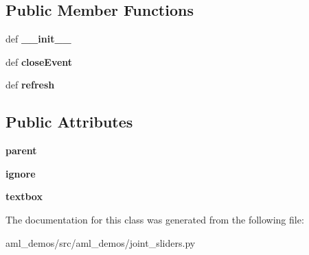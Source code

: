 \subsection*{Public Member Functions}
\begin{DoxyCompactItemize}
\item 
\hypertarget{classaml__demos_1_1joint__sliders_1_1_state_popup_a8aced35ad440a8c853843206334f47fd}{def {\bfseries \-\_\-\-\_\-init\-\_\-\-\_\-}}\label{classaml__demos_1_1joint__sliders_1_1_state_popup_a8aced35ad440a8c853843206334f47fd}

\item 
\hypertarget{classaml__demos_1_1joint__sliders_1_1_state_popup_a59a90fad6f1406fccb74091d907baaf0}{def {\bfseries close\-Event}}\label{classaml__demos_1_1joint__sliders_1_1_state_popup_a59a90fad6f1406fccb74091d907baaf0}

\item 
\hypertarget{classaml__demos_1_1joint__sliders_1_1_state_popup_abcc60896031b621b681c9b1556e28df5}{def {\bfseries refresh}}\label{classaml__demos_1_1joint__sliders_1_1_state_popup_abcc60896031b621b681c9b1556e28df5}

\end{DoxyCompactItemize}
\subsection*{Public Attributes}
\begin{DoxyCompactItemize}
\item 
\hypertarget{classaml__demos_1_1joint__sliders_1_1_state_popup_a3407f51616c17fbf221195112c8d7e23}{{\bfseries parent}}\label{classaml__demos_1_1joint__sliders_1_1_state_popup_a3407f51616c17fbf221195112c8d7e23}

\item 
\hypertarget{classaml__demos_1_1joint__sliders_1_1_state_popup_aefb38563c6148299f012decb8467fda2}{{\bfseries ignore}}\label{classaml__demos_1_1joint__sliders_1_1_state_popup_aefb38563c6148299f012decb8467fda2}

\item 
\hypertarget{classaml__demos_1_1joint__sliders_1_1_state_popup_ac289c03f504b491c0df30ad704862879}{{\bfseries textbox}}\label{classaml__demos_1_1joint__sliders_1_1_state_popup_ac289c03f504b491c0df30ad704862879}

\end{DoxyCompactItemize}


The documentation for this class was generated from the following file\-:\begin{DoxyCompactItemize}
\item 
aml\-\_\-demos/src/aml\-\_\-demos/joint\-\_\-sliders.\-py\end{DoxyCompactItemize}
